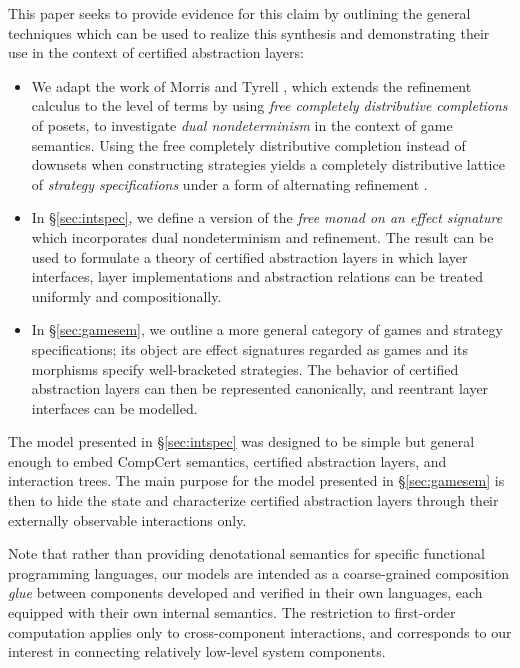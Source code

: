 \documentclass[sigplan,screen]{acmart}
\begin{document}
This paper seeks to provide evidence for this claim
by outlining the general techniques
which can be used to realize this synthesis
and demonstrating their use
in the context of certified abstraction layers:
\begin{itemize}
\item
  We adapt the work of Morris and Tyrell \cite{augtyp,dndf},
  which extends the refinement calculus to the level of terms
  by using \emph{free completely distributive completions} of posets,
  to investigate \emph{dual nondeterminism}
  in the context of game semantics.
  Using the free completely distributive completion
  instead of downsets when constructing strategies
  yields a completely distributive lattice of
  \emph{strategy specifications}
  under a form of alternating refinement
  \cite{altref}.
\item
  In \S\ref{sec:intspec},
  we define a version of the
  \emph{free monad on an effect signature}
  which incorporates dual nondeterminism and refinement.
  The result can be used to formulate a theory of certified abstraction
  layers in which
  layer interfaces, layer implementations and abstraction relations
  can be treated uniformly and compositionally.
\item
  In \S\ref{sec:gamesem},
  we outline a more general category of games and
  strategy specifications;
  its object are effect signatures regarded as games
  and its morphisms specify well-bracketed strategies.
  The behavior of certified abstraction layers
  can then be represented canonically,
  and reentrant layer interfaces can be modelled.
\end{itemize}

The model presented in \S\ref{sec:intspec} was designed to be simple but
general enough to embed CompCert semantics, certified
abstraction layers, and interaction trees. The main purpose for
the model presented in \S\ref{sec:gamesem} is then to hide the state and
characterize certified abstraction layers through
their externally observable interactions only.

Note that rather than providing
denotational semantics for specific functional programming
languages, our models are intended as a coarse-grained composition
\emph{glue} between components developed and verified in their own
languages, each equipped with their own internal semantics.
The restriction to first-order computation
applies only to cross-component interactions,
and corresponds to our interest in connecting
relatively low-level system components.
\end{document}
